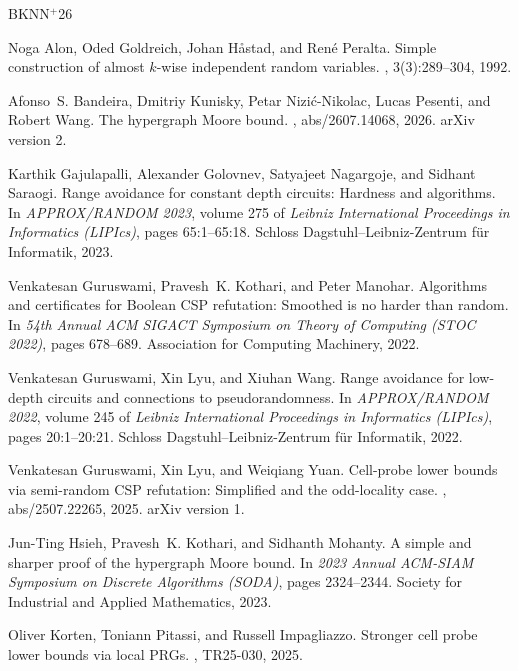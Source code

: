 \documentclass[letterpaper,11pt]{article}
\theoremstyle{definition}
\begin{document}
\newcommand{\etalchar}[1]{$^{#1}$}
\begin{thebibliography}{BKNN{\etalchar{+}}26}

Noga Alon, Oded Goldreich, Johan H{\aa}stad, and Ren{\'e} Peralta.
\newblock Simple construction of almost {$k$}-wise independent random
  variables.
, 3(3):289--304, 1992.

\bibitem[BKNN{\etalchar{+}}26]{BKNPW26}
Afonso~S. Bandeira, Dmitriy Kunisky, Petar Nizi{\'c}-Nikolac, Lucas Pesenti,
  and Robert Wang.
\newblock The hypergraph {Moore} bound.
, abs/2607.14068, 2026.
\newblock arXiv version 2.

Karthik Gajulapalli, Alexander Golovnev, Satyajeet Nagargoje, and Sidhant
  Saraogi.
\newblock Range avoidance for constant depth circuits: Hardness and algorithms.
\newblock In {\em APPROX/RANDOM 2023}, volume 275 of {\em Leibniz International
  Proceedings in Informatics (LIPIcs)}, pages 65:1--65:18. Schloss
  Dagstuhl--Leibniz-Zentrum f\"ur Informatik, 2023.

Venkatesan Guruswami, Pravesh~K. Kothari, and Peter Manohar.
\newblock Algorithms and certificates for {Boolean CSP} refutation: Smoothed is
  no harder than random.
\newblock In {\em 54th Annual ACM SIGACT Symposium on Theory of Computing (STOC
  2022)}, pages 678--689. Association for Computing Machinery, 2022.

Venkatesan Guruswami, Xin Lyu, and Xiuhan Wang.
\newblock Range avoidance for low-depth circuits and connections to
  pseudorandomness.
\newblock In {\em APPROX/RANDOM 2022}, volume 245 of {\em Leibniz International
  Proceedings in Informatics (LIPIcs)}, pages 20:1--20:21. Schloss
  Dagstuhl--Leibniz-Zentrum f\"ur Informatik, 2022.

Venkatesan Guruswami, Xin Lyu, and Weiqiang Yuan.
\newblock Cell-probe lower bounds via semi-random {CSP} refutation: Simplified
  and the odd-locality case.
, abs/2507.22265, 2025.
\newblock arXiv version 1.

Jun-Ting Hsieh, Pravesh~K. Kothari, and Sidhanth Mohanty.
\newblock A simple and sharper proof of the hypergraph {Moore} bound.
\newblock In {\em 2023 Annual ACM-SIAM Symposium on Discrete Algorithms
  (SODA)}, pages 2324--2344. Society for Industrial and Applied Mathematics,
  2023.

Oliver Korten, Toniann Pitassi, and Russell Impagliazzo.
\newblock Stronger cell probe lower bounds via local {PRGs}.
, TR25-030,
  2025.


\end{thebibliography}
\end{document}
